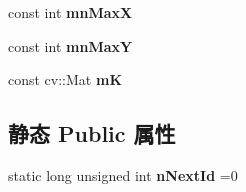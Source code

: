 \begin{DoxyCompactItemize}
\item 
\hypertarget{classORB__SLAM2_1_1KeyFrame_a677fd210bec35232bda003b543d0acfc}{const int {\bfseries mn\-Max\-X}}\label{classORB__SLAM2_1_1KeyFrame_a677fd210bec35232bda003b543d0acfc}

\item 
\hypertarget{classORB__SLAM2_1_1KeyFrame_ababbbd404314965b13a51e6414dce6ad}{const int {\bfseries mn\-Max\-Y}}\label{classORB__SLAM2_1_1KeyFrame_ababbbd404314965b13a51e6414dce6ad}

\item 
\hypertarget{classORB__SLAM2_1_1KeyFrame_afcb8246d60511b756ba241de680e96ac}{const cv\-::\-Mat {\bfseries m\-K}}\label{classORB__SLAM2_1_1KeyFrame_afcb8246d60511b756ba241de680e96ac}

\end{DoxyCompactItemize}
\subsection*{静态 Public 属性}
\begin{DoxyCompactItemize}
\item 
\hypertarget{classORB__SLAM2_1_1KeyFrame_acb0d220936541a8afc020a65aa675559}{static long unsigned int {\bfseries n\-Next\-Id} =0}\label{classORB__SLAM2_1_1KeyFrame_acb0d220936541a8afc020a65aa675559}

\end{DoxyCompactItemize}
